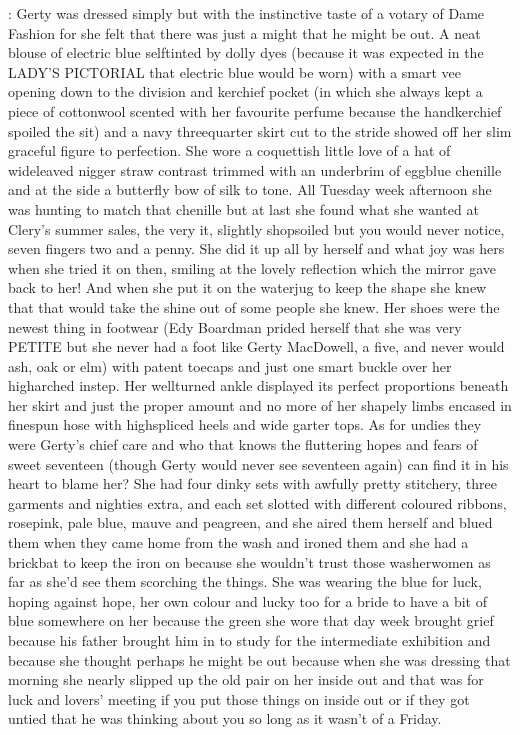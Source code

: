 :
Gerty was dressed simply but with the instinctive taste of a votary of
Dame Fashion for she felt that there was just a might that he might be
out. A neat blouse of electric blue selftinted by dolly dyes (because it
was expected in the LADY'S PICTORIAL that electric blue would be worn)
with a smart vee opening down to the division and kerchief pocket
(in which she always kept a piece of cottonwool scented with her
favourite perfume because the handkerchief spoiled the sit) and a
navy threequarter skirt cut to the stride showed off her slim graceful
figure to perfection. She wore a coquettish little love of a hat of
wideleaved nigger straw contrast trimmed with an underbrim of eggblue
chenille and at the side a butterfly bow of silk to tone. All Tuesday
week afternoon she was hunting to match that chenille but at last
she found what she wanted at Clery's summer sales, the very it, slightly
shopsoiled but you would never notice, seven fingers two and a penny. She
did it up all by herself and what joy was hers when she tried it on then,
smiling at the lovely reflection which the mirror gave back to her!
And when she put it on the waterjug to keep the shape she knew that that
would take the shine out of some people she knew. Her shoes were the
newest thing in footwear (Edy Boardman prided herself that she was very
PETITE but she never had a foot like Gerty MacDowell, a five, and never
would ash, oak or elm) with patent toecaps and just one smart buckle over
her higharched instep. Her wellturned ankle displayed its perfect
proportions beneath her skirt and just the proper amount and no more of
her shapely limbs encased in finespun hose with highspliced heels and wide
garter tops. As for undies they were Gerty's chief care and who that knows
the fluttering hopes and fears of sweet seventeen (though Gerty would
never see seventeen again) can find it in his heart to blame her? She had
four dinky sets with awfully pretty stitchery, three garments and
nighties extra, and each set slotted with different coloured ribbons,
rosepink, pale blue, mauve and peagreen, and she aired them herself
and blued them when they came home from the wash and ironed them
and she had a brickbat to keep the iron on because she wouldn't trust
those washerwomen as far as she'd see them scorching the things.
She was wearing the blue for luck, hoping against hope, her own
colour and lucky too for a bride to have a bit of blue somewhere
on her because the green she wore that day week brought grief because
his father brought him in to study for the intermediate exhibition
and because she thought perhaps he might be out because when she was
dressing that morning she nearly slipped up the old pair on her inside out
and that was for luck and lovers' meeting if you put those things on
inside out or if they got untied that he was thinking about you so long
as it wasn't of a Friday.

